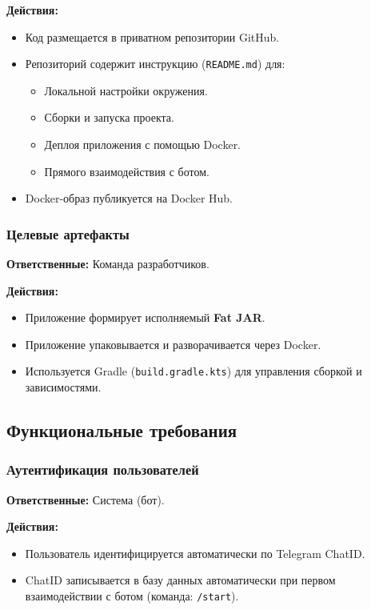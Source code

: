 \documentclass[areasetadvanced]{scrartcl}
\begin{document}
\textbf{Действия:}
\begin{itemize}
  \item Код размещается в приватном репозитории GitHub.
  \item Репозиторий содержит инструкцию (\texttt{README.md}) для:
    \begin{itemize}
      \item Локальной настройки окружения.
      \item Сборки и запуска проекта.
      \item Деплоя приложения с помощью Docker.
      \item Прямого взаимодействия с ботом.
    \end{itemize}
  \item Docker-образ публикуется на Docker Hub.
\end{itemize}

\subsubsection{Целевые артефакты}
\textbf{Ответственные:} Команда разработчиков.

\textbf{Действия:}
\begin{itemize}
  \item Приложение формирует исполняемый \textbf{Fat JAR}.
  \item Приложение упаковывается и разворачивается через Docker.
  \item Используется Gradle (\texttt{build.gradle.kts}) для управления сборкой и зависимостями.
\end{itemize}

\subsection{Функциональные требования}

\subsubsection{Аутентификация пользователей}
\textbf{Ответственные:} Система (бот).

\textbf{Действия:}
\begin{itemize}
  \item Пользователь идентифицируется автоматически по Telegram ChatID.
  \item ChatID записывается в базу данных автоматически при первом взаимодействии с ботом (команда: \texttt{/start}).
\end{itemize}
\end{document}
